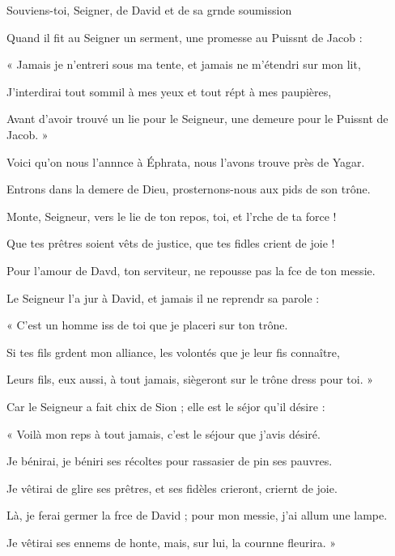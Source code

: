 \item Souviens-toi, Seigner, de David\psstar{} et de sa grnde soumission
\item Quand il fit au Seigner un serment,\psstar{} une promesse au Puissnt de Jacob :
\item « Jamais je n’entreri sous ma tente,\psstar{} et jamais ne m’étendri sur mon lit,
\item J’interdirai tout sommil à mes yeux\psstar{} et tout répt à mes paupières,
\item Avant d’avoir trouvé un lie pour le Seigneur,\psstar{} une demeure pour le Puissnt de Jacob. »
\item Voici qu’on nous l’annnce à Éphrata,\psstar{} nous l’avons trouve près de Yagar.
\item Entrons dans la demere de Dieu,\psstar{} prosternons-nous aux pids de son trône.
\item Monte, Seigneur, vers le lie de ton repos,\psstar{} toi, et l’rche de ta force !
\item Que tes prêtres soient vêts de justice,\psstar{} que tes fidles crient de joie !
\item Pour l’amour de Davd, ton serviteur,\psstar{} ne repousse pas la fce de ton messie.
\item Le Seigneur l’a jur à David,\psstar{} et jamais il ne reprendr sa parole : 
\item « C’est un homme iss de toi\psstar{} que je placeri sur ton trône.
\item Si tes fils grdent mon alliance,\psstar{} les volontés que je leur fis connaître, 
\item Leurs fils, eux aussi, à tout jamais,\psstar{} siègeront sur le trône dress pour toi. »
\item Car le Seigneur a fait chix de Sion ;\psstar{} elle est le séjor qu’il désire :
\item « Voilà mon reps à tout jamais,\psstar{} c’est le séjour que j’avis désiré.
\item Je bénirai, je béniri ses récoltes\psstar{} pour rassasier de pin ses pauvres.
\item Je vêtirai de glire ses prêtres,\psstar{} et ses fidèles crieront, criernt de joie.
\item Là, je ferai germer la frce de David ;\psstar{} pour mon messie, j’ai allum une lampe.
\item Je vêtirai ses ennems de honte,\psstar{} mais, sur lui, la cournne fleurira. »
